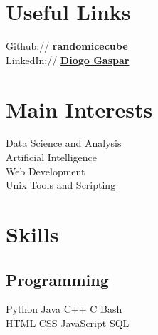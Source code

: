 \documentclass[]{deedy-resume-openfont}
\begin{document}
%
%
\lastupdated

%
%

%
%

\begin{minipage}[t]{0.33\textwidth}


\section{Useful Links} 
Github:// \href{https://github.com/randomicecube}{\bf randomicecube} \\
LinkedIn://  \href{https://www.linkedin.com/in/diogo-gaspar-74142821b/}{\bf Diogo Gaspar}


\section{Main Interests}
Data Science and Analysis \\
Artificial Intelligence \\
Web Development\\
Unix Tools and Scripting


\section{Skills}
\subsection{Programming}
Python \textbullet{} Java \textbullet{} C++ \textbullet{} C \textbullet{} Bash\\
HTML \textbullet{} CSS \textbullet{} JavaScript \textbullet{} SQL
\sectionsep


\end{minipage}
\end{document}
